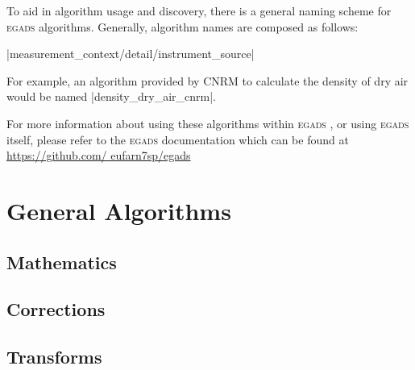 \documentclass[a4paper,11pt]{report}
\newcommand{\egads}{\textsc{egads} }
\begin{document}
To aid in algorithm usage and discovery, there is a general naming scheme for \egads algorithms. Generally, algorithm names are composed as follows: 


|{measurement}_{context/detail/instrument}_{source}| 


For example, an algorithm provided by CNRM to calculate the density of dry air would be named |density_dry_air_cnrm|.

For more information about using these algorithms within \egads, or using \egads itself, please refer
to the \egads documentation which can be found at \href{https://github.com/eufarn7sp/egads}
{https://github.com/ eufarn7sp/egads}



\part{General Algorithms}

\chapter{Mathematics}



\chapter{Corrections}



\chapter{Transforms}








\end{document}
